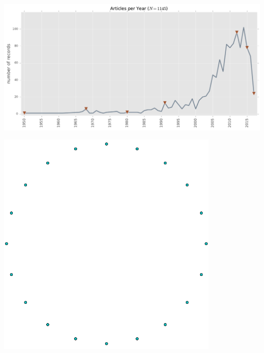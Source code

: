 \documentclass{beamer}
\begin{document}
\begin{frame}
    \begin{center}
        \includegraphics[width=\textwidth]{static/timeline.pdf}
    \end{center}
\end{frame}

\begin{frame}
    \begin{center}
        \includegraphics[width=0.8\textwidth]{static/death_star.png}
    \end{center}
\end{frame}
\end{document}
